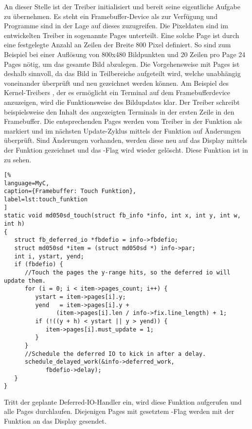 An dieser Stelle ist der Treiber initialisiert und bereit seine eigentliche Aufgabe zu übernehmen. Es steht ein Framebuffer-Device als  zur Verfügung und Programme sind in der Lage auf dieses zuzugreifen.
Die Pixeldaten sind im entwickelten Treiber in sogenannte Pages unterteilt. Eine solche Page ist durch eine festgelegte Anzahl an Zeilen der Breite 800 Pixel definiert. So sind zum Beispiel bei einer Auflösung von 800x480 Bildpunkten und 20 Zeilen pro Page 24 Pages nötig, um das gesamte Bild abzulegen. Die Vorgehensweise mit Pages ist deshalb sinnvoll, da das Bild in Teilbereiche aufgeteilt wird, welche unabhängig voneinander überprüft und neu gezeichnet werden können. Am Beispiel des Kernel-Treibers , der es ermöglicht ein Terminal auf dem Framebufferdevice anzuzeigen, wird die Funktionsweise des Bildupdates klar. Der Treiber  schreibt beispielsweise den Inhalt des angezeigten Terminals in der ersten Zeile in den Framebuffer. Die entsprechenden Pages werden vom Treiber in der Funktion  als  markiert und im nächsten Update-Zyklus mittels der Funktion  auf Änderungen überprüft. Sind Änderungen vorhanden, werden diese neu auf das Display mittels der Funktion  gezeichnet und das -Flag wird wieder gelöscht. Diese Funktion ist in
 zu sehen. 
\begin{lstlisting}[%
language=MyC,
caption={Framebuffer: Touch Funktion},
label=lst:touch_funktion
]
static void md050sd_touch(struct fb_info *info, int x, int y, int w, int h)
{
   struct fb_deferred_io *fbdefio = info->fbdefio;
   struct md050sd *item = (struct md050sd *) info->par;
   int i, ystart, yend;
   if (fbdefio) {
      //Touch the pages the y-range hits, so the deferred io will update them.
      for (i = 0; i < item->pages_count; i++) {
         ystart = item->pages[i].y;
         yend   = item->pages[i].y +
               (item->pages[i].len / info->fix.line_length) + 1;
         if (!((y + h) < ystart || y > yend)) {
            item->pages[i].must_update = 1;
         }
      }
      //Schedule the deferred IO to kick in after a delay.
      schedule_delayed_work(&info->deferred_work,
            fbdefio->delay);
   }
}
\end{lstlisting}
Tritt der geplante Deferred-IO-Handler ein, wird diese Funktion  aufgerufen und alle Pages durchlaufen. Diejenigen Pages mit gesetztem -Flag werden mit der Funktion  an das Display gesendet.
